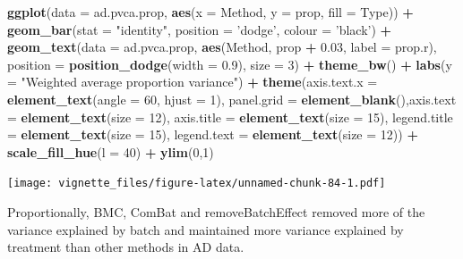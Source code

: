 \documentclass[]{book}
\newenvironment{Shaded}{\begin{snugshade}}{\end{snugshade}}
\newcommand{\KeywordTok}[1]{\textcolor[rgb]{0.13,0.29,0.53}{\textbf{#1}}}
\newcommand{\DataTypeTok}[1]{\textcolor[rgb]{0.13,0.29,0.53}{#1}}
\newcommand{\DecValTok}[1]{\textcolor[rgb]{0.00,0.00,0.81}{#1}}
\newcommand{\FloatTok}[1]{\textcolor[rgb]{0.00,0.00,0.81}{#1}}
\newcommand{\StringTok}[1]{\textcolor[rgb]{0.31,0.60,0.02}{#1}}
\newcommand{\OperatorTok}[1]{\textcolor[rgb]{0.81,0.36,0.00}{\textbf{#1}}}
\newcommand{\NormalTok}[1]{#1}
\begin{document}
\begin{Shaded}
\begin{Highlighting}[]
\KeywordTok{ggplot}\NormalTok{(}\DataTypeTok{data =}\NormalTok{ ad.pvca.prop, }\KeywordTok{aes}\NormalTok{(}\DataTypeTok{x =}\NormalTok{ Method, }\DataTypeTok{y =}\NormalTok{ prop, }\DataTypeTok{fill =}\NormalTok{ Type)) }\OperatorTok{+}\StringTok{ }
\StringTok{  }\KeywordTok{geom_bar}\NormalTok{(}\DataTypeTok{stat =} \StringTok{"identity"}\NormalTok{, }\DataTypeTok{position =} \StringTok{'dodge'}\NormalTok{, }\DataTypeTok{colour =} \StringTok{'black'}\NormalTok{) }\OperatorTok{+}\StringTok{ }
\StringTok{  }\KeywordTok{geom_text}\NormalTok{(}\DataTypeTok{data =}\NormalTok{ ad.pvca.prop, }\KeywordTok{aes}\NormalTok{(Method, prop }\OperatorTok{+}\StringTok{ }\FloatTok{0.03}\NormalTok{, }\DataTypeTok{label =}\NormalTok{ prop.r), }
            \DataTypeTok{position =} \KeywordTok{position_dodge}\NormalTok{(}\DataTypeTok{width =} \FloatTok{0.9}\NormalTok{), }\DataTypeTok{size =} \DecValTok{3}\NormalTok{) }\OperatorTok{+}\StringTok{ }\KeywordTok{theme_bw}\NormalTok{() }\OperatorTok{+}\StringTok{ }
\StringTok{  }\KeywordTok{labs}\NormalTok{(}\DataTypeTok{y =} \StringTok{"Weighted average proportion variance"}\NormalTok{) }\OperatorTok{+}\StringTok{ }
\StringTok{  }\KeywordTok{theme}\NormalTok{(}\DataTypeTok{axis.text.x =} \KeywordTok{element_text}\NormalTok{(}\DataTypeTok{angle =} \DecValTok{60}\NormalTok{, }\DataTypeTok{hjust =} \DecValTok{1}\NormalTok{), }
        \DataTypeTok{panel.grid =} \KeywordTok{element_blank}\NormalTok{(),}\DataTypeTok{axis.text =} \KeywordTok{element_text}\NormalTok{(}\DataTypeTok{size =} \DecValTok{12}\NormalTok{), }
        \DataTypeTok{axis.title =} \KeywordTok{element_text}\NormalTok{(}\DataTypeTok{size =} \DecValTok{15}\NormalTok{), }\DataTypeTok{legend.title =} \KeywordTok{element_text}\NormalTok{(}\DataTypeTok{size =} \DecValTok{15}\NormalTok{), }
        \DataTypeTok{legend.text =} \KeywordTok{element_text}\NormalTok{(}\DataTypeTok{size =} \DecValTok{12}\NormalTok{)) }\OperatorTok{+}\StringTok{ }\KeywordTok{scale_fill_hue}\NormalTok{(}\DataTypeTok{l =} \DecValTok{40}\NormalTok{) }\OperatorTok{+}\StringTok{ }\KeywordTok{ylim}\NormalTok{(}\DecValTok{0}\NormalTok{,}\DecValTok{1}\NormalTok{)}
\end{Highlighting}
\end{Shaded}

\texttt{[image: vignette\_files/figure-latex/unnamed-chunk-84-1.pdf]}

Proportionally, BMC, ComBat and removeBatchEffect removed more of the
variance explained by batch and maintained more variance explained by
treatment than other methods in AD data.
\end{document}
